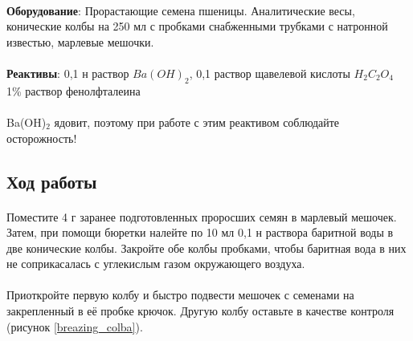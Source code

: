 \begin{footnotesize}

\paragraph*{}\textbf{Оборудование}: Прорастающие семена пшеницы. Аналитические весы, конические колбы на 250 мл с пробками снабженными трубками с натронной известью, марлевые мешочки. 

\paragraph*{}\textbf{Реактивы}: 0,1 н раствор $Ba(OH)_2$, 0,1 раствор щавелевой кислоты $H{_2}C{_2}O{_4}$ 1\% раствор фенолфталеина

\end{footnotesize}

\paragraph*{\warningsign}Ba(OH)$_2$ ядовит, поэтому при работе с этим реактивом соблюдайте осторожность!

\subsection*{Ход работы}

\paragraph*{}Поместите 4 г заранее подготовленных проросших семян в марлевый мешочек. Затем, при помощи бюретки налейте по 10 мл 0,1 н раствора баритной воды в две конические колбы. Закройте обе колбы пробками, чтобы баритная вода в них не соприкасалась с углекислым газом окружающего воздуха. 

\paragraph*{}Приоткройте первую колбу и быстро подвести мешочек с семенами на закрепленный в её пробке крючок. Другую колбу оставьте в качестве контроля (рисунок \ref{breazing_colba}). 

